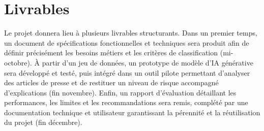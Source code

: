 \section{Livrables}

Le projet donnera lieu à plusieurs livrables structurants. Dans un premier temps, un document de spécifications
fonctionnelles et techniques sera produit afin de définir précisément les besoins métiers et les critères de classification (mi-octobre).
À partir d'un jeu de données, un prototype de modèle d’IA générative sera développé et testé, puis intégré dans un outil
pilote permettant d’analyser des articles de presse et de restituer un niveau de risque accompagné d’explications (fin novembre).
Enfin, un rapport d’évaluation détaillant les performances, les limites et les recommandations sera remis, complété par
une documentation technique et utilisateur garantissant la pérennité et la réutilisation du projet (fin décembre).

